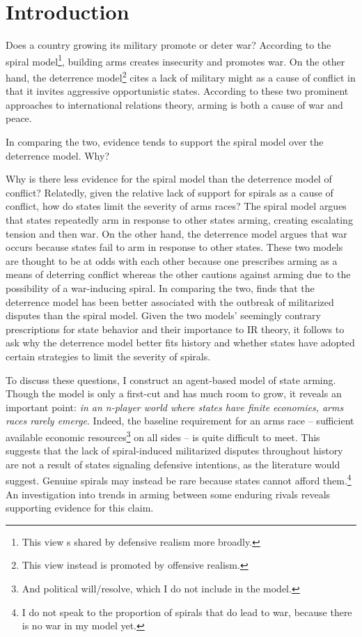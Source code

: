 \documentclass[12pt]{article}
\begin{document}
\doublespacing

\section{Introduction}\label{introduction}

Does a country growing its military promote or deter war? According to the spiral model\footnote{This view s shared by defensive realism more broadly.}, building arms creates insecurity and promotes war. On the other hand, the deterrence model\footnote{This view instead is promoted by offensive realism.} cites a lack of military might as a cause of conflict in that it invites aggressive opportunistic states. According to these two prominent approaches to international relations theory, arming is both a cause of war and peace.

In comparing the two, evidence tends to support the spiral model over the deterrence model. Why?

Why is there less evidence for the spiral model than the deterrence model of conflict? Relatedly, given the relative lack of support for spirals as a cause of conflict, how do states limit the severity of arms races? The spiral model argues that states repeatedly arm in response to other states arming, creating escalating tension and then war. \citep[e.g.][]{downs1985, jervis1978, powell1993} On the other hand, the deterrence model argues that war occurs because states fail to arm in response to other states. \citep[e.g.][]{achen1989, huth1993} These two models are thought to be at odds with each other because one prescribes arming as a means of deterring conflict whereas the other cautions against arming due to the possibility of a war-inducing spiral. In comparing the two, \citet{braumoeller2008} finds that the deterrence model has been better associated with the outbreak of militarized disputes than the spiral model. Given the two models' seemingly contrary prescriptions for state behavior and their importance to IR theory, it follows to ask why the deterrence model better fits history and whether states have adopted certain strategies to limit the severity of spirals.

To discuss these questions, I construct an agent-based model of state arming. Though the model is only a first-cut and has much room to grow, it reveals an important point: \textit{in an n-player world where states have finite economies, arms races rarely emerge}. Indeed, the baseline requirement for an arms race -- sufficient available economic resources\footnote{And political will/resolve, which I do not include in the model.} on all sides -- is quite difficult to meet. This suggests that the lack of spiral-induced militarized disputes throughout history are not a result of states signaling defensive intentions, as the literature would suggest. Genuine spirals may instead be rare because states cannot afford them.\footnote{I do not speak to the proportion of spirals that do lead to war, because there is no war in my model yet.} An investigation into trends in arming between some enduring rivals reveals supporting evidence for this claim.
\end{document}
